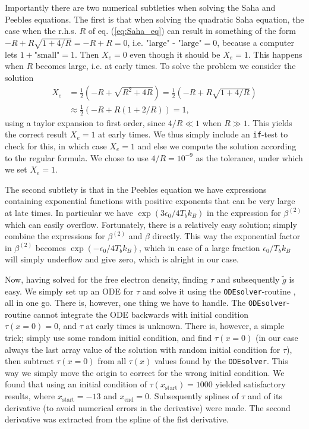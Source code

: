 \documentclass[twocolumn]{aastex62}
\begin{document}
Importantly there are two numerical subtleties when solving the Saha and Peebles equations. The first is that when solving the quadratic Saha equation, the case when the r.h.s. $R$ of eq. (\ref{eq:Saha_eq}) can result in something of the form $-R + R\sqrt{1 + 4/R} = -R + R = 0$, i.e. $\text{"large" - "large"} = 0$, because a computer lets $1 + \text{"small"} = 1$. Then $X_e = 0$ even though it should be $X_e = 1$. This happens when $R$ becomes large, i.e. at early times. To solve the problem we consider the solution 
\begin{align}
    X_e &= \frac{1}{2} (-R + \sqrt{R^2 + 4R}) = \frac{1}{2} (-R + R\sqrt{1 + 4/R})\\
        &\approx \frac{1}{2} (-R + R(1 + 2/R)) = 1,
\end{align}
using a taylor expansion to first order, since $4/R \ll 1$ when $R\gg 1$. This yields the correct result $X_e = 1$ at early times. We thus simply include an \texttt{if}-test to check for this, in which case $X_e = 1$ and else we compute the solution according to the regular formula. We chose to use $4/R = 10^{-9}$ as the tolerance, under which we set $X_e = 1$. 

The second subtlety is that in the Peebles equation we have expressions containing exponential functions with positive exponents that can be very large at late times. In particular we have $\exp\left(3\epsilon_0 / 4T_b k_B\right)$ in the expression for $\beta^{(2)}$ which can easily overflow. Fortunately, there is a relatively easy solution; simply combine the expressions for $\beta^{(2)}$ and $\beta$ directly. This way the exponential factor in $\beta^{(2)}$ becomes $\exp\left(-\epsilon_0 / 4T_b k_B\right)$, which in case of a large fraction $\epsilon_0 / T_b k_B$ will simply underflow and give zero, which is alright in our case.

Now, having solved for the free electron density, finding $\tau$ and subsequently $\tilde{g}$ is easy. We simply set up an ODE for $\tau$ and solve it using the \texttt{ODEsolver}-routine \citep[]{winther:2020}, all in one go. There is, however, one thing we have to handle. The \texttt{ODEsolver}-routine cannot integrate the ODE backwards with initial condition $\tau(x = 0) = 0$, and $\tau$ at early times is unknown. There is, however, a simple trick; simply use some random initial condition, and find $\tau(x=0)$ (in our case always the last array value of the solution with random initial condition for $\tau$), then subtract $\tau(x = 0)$ from all $\tau(x)$ values found by the \texttt{ODEsolver}. This way we simply move the origin to correct for the wrong initial condition. We found that using an initial condition of $\tau(x_\text{start}) = 1000$ yielded satisfactory results, where $x_\text{start} = -13$ and $x_\text{end} = 0$. Subsequently splines of $\tau$ and of its derivative (to avoid numerical errors in the derivative) were made. The second derivative was extracted from the spline of the fist derivative.
\end{document}
